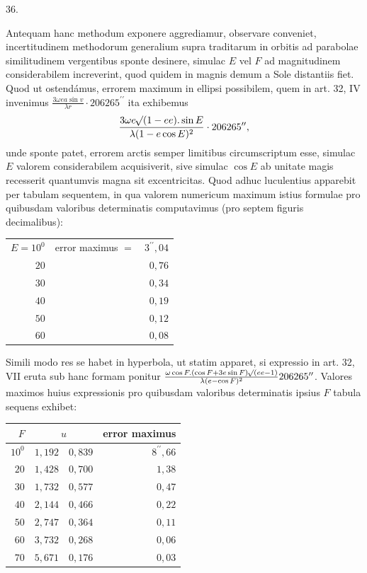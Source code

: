 \begin{center}
\hypertarget{native-053-article036}{}36.
\end{center}
Antequam hanc methodum exponere aggrediamur, observare conveniet, incertitudinem methodorum generalium supra traditarum in orbitis ad parabolae similitudinem vergentibus sponte desinere, simulac $E$ vel $F$ ad magnitudinem considerabilem increverint, quod quidem in magnis demum a Sole distantiis fiet. Quod ut ostendámus, errorem maximum in ellipsi possibilem, quem in art. 32, IV invenimus $\frac{3\omega ea\sin v}{\lambda r}\cdot206265^{\prime\prime}$ ita exhibemus
\[
\frac{3\omega e\mathord{{}^{}\!\surd}(1-ee).\sin E}{\lambda(1-e\cos E)^2}\cdot206265^{\prime\prime},
\]
unde sponte patet, errorem arctis semper limitibus circumscriptum esse, simulac $E$ valorem considerabilem acquisiverit, sive simulac $\cos E$ ab unitate magis recesserit quantumvis magna sit excentricitas. Quod adhuc luculentius apparebit per tabulam sequentem, in qua valorem numericum maximum istius formulae pro quibusdam valoribus determinatis computavimus (pro septem figuris decimalibus):
\begin{center}
\begin{tabular}{r|lr}
$E=10^0$ & error maximus $=$ & $3^{\prime\prime}{,}04$\\
$20$ & & $0{,}76$\\
$30$ & & $0{,}34$\\
$40$ & & $0{,}19$\\
$50$ & & $0{,}12$\\
$60$ & & $0{,}08$
\end{tabular}
\end{center}
\noindent Simili modo res se habet in hyperbola, ut statim apparet, si expressio in art. 32, VII eruta sub hanc formam ponitur $\frac{\omega\cos F.(\cos F+3e\sin F)\mathord{{}^{}\!\surd}(ee-1)}{\lambda(e-\cos F)^2}206265^{\prime\prime}$. Valores maximos huius expressionis pro quibusdam valoribus determinatis ipsius $F$ tabula sequens exhibet:
\begin{center}
\begin{tabular}{r|r|r|r}
\hline
$F$ & \multicolumn{2}{c|}{$u$} & error maximus\\
\hline
$10^0$ & $1{,}192$ & $0{,}839$ & $8^{\prime\prime}{,}66$\\
$20$ & $1{,}428$ & $0{,}700$ & $1{,}38$\\
$30$ & $1{,}732$ & $0{,}577$ & $0{,}47$\\
$40$ & $2{,}144$ & $0{,}466$ & $0{,}22$\\
$50$ & $2{,}747$ & $0{,}364$ & $0{,}11$\\
$60$ & $3{,}732$ & $0{,}268$ & $0{,}06$\\
$70$ & $5{,}671$ & $0{,}176$ & $0{,}03$
\end{tabular}
\end{center}
